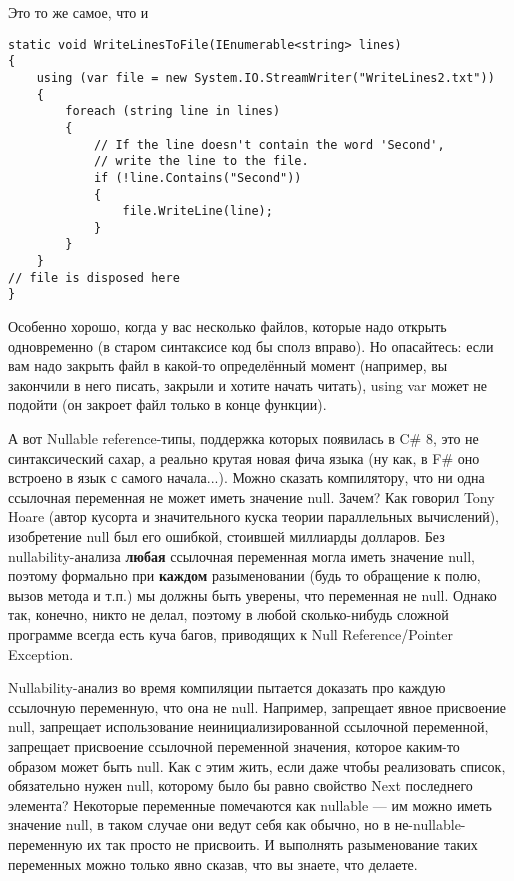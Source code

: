 \documentclass{../../text-style}
\begin{document}
Это то же самое, что и

\begin{verbatim}
static void WriteLinesToFile(IEnumerable<string> lines)
{
    using (var file = new System.IO.StreamWriter("WriteLines2.txt")) 
    {
        foreach (string line in lines)
        {
            // If the line doesn't contain the word 'Second', 
            // write the line to the file.
            if (!line.Contains("Second"))
            {
                file.WriteLine(line);
            }
        }
    }
// file is disposed here
}
\end{verbatim}

Особенно хорошо, когда у вас несколько файлов, которые надо открыть одновременно (в старом синтаксисе код бы сполз вправо). Но опасайтесь: если вам надо закрыть файл в какой-то определённый момент (например, вы закончили в него писать, закрыли и хотите начать читать), using var может не подойти (он закроет файл только в конце функции).

А вот Nullable reference-типы, поддержка которых появилась в C\# 8, это не синтаксический сахар, а реально крутая новая фича языка (ну как, в F\# оно встроено в язык с самого начала...). Можно сказать компилятору, что ни одна ссылочная переменная не может иметь значение null. Зачем? Как говорил Tony Hoare (автор кусорта и значительного куска теории параллельных вычислений), изобретение null был его ошибкой, стоившей миллиарды долларов. Без nullability-анализа \textbf{любая} ссылочная переменная могла иметь значение null, поэтому формально при \textbf{каждом} разыменовании (будь то обращение к полю, вызов метода и т.п.) мы должны быть уверены, что переменная не null. Однако так, конечно, никто не делал, поэтому в любой сколько-нибудь сложной программе всегда есть куча багов, приводящих к Null Reference/Pointer Exception.

Nullability-анализ во время компиляции пытается доказать про каждую ссылочную переменную, что она не null. Например, запрещает явное присвоение null, запрещает использование неинициализированной ссылочной переменной, запрещает присвоение ссылочной переменной значения, которое каким-то образом может быть null. Как с этим жить, если даже чтобы реализовать список, обязательно нужен null, которому было бы равно свойство Next последнего элемента? Некоторые переменные помечаются как nullable --- им можно иметь значение null, в таком случае они ведут себя как обычно, но в не-nullable-переменную их так просто не присвоить. И выполнять разыменование таких переменных можно только явно сказав, что вы знаете, что делаете. 
\end{document}
